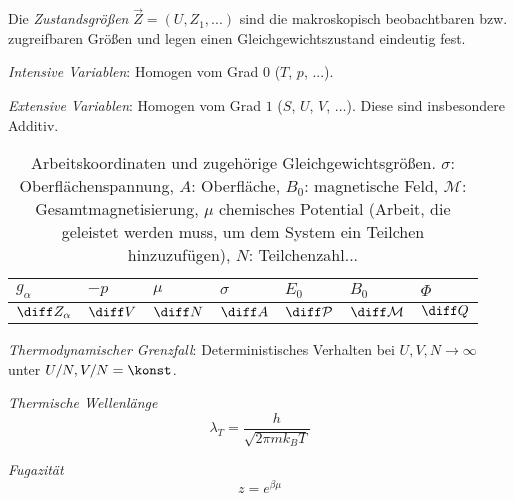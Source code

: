 \documentclass[11pt]{article}
\numberwithin{equation}{section}
\begin{document}
				Die \emph{Zustandsgrößen} $\vec{Z}=\left(U, Z_1,... \right)$ sind die makroskopisch beobachtbaren bzw. zugreifbaren Größen und legen einen Gleichgewichtszustand eindeutig fest. \vsp

				\emph{Intensive Variablen}: Homogen vom Grad $0$ ($T$, $p$, ...). \vsp

				\emph{Extensive Variablen}: Homogen vom Grad $1$ ($S$, $U$, $V$, ...). Diese sind insbesondere Additiv. \vsp

				\begin{table}[h]
					\begin{center}
					\begin{tabular}{ l | l l l l l l }
						$g_\alpha$ & $-p$ & $\mu$ & $\sigma$ & $E_0$ & $B_0$ & $\Phi$ \\ \hline
						$\diff Z_\alpha$ & $\diff V$ & $\diff N$ & $\diff A$ & $\diff \mathcal{P}$ & $\diff \mathcal{M}$ & $\diff Q$ \\
						\end{tabular}
					\caption{Arbeitskoordinaten und zugehörige Gleichgewichtsgrößen. $\sigma$: Oberflächenspannung, $A$: Oberfläche, $B_0$: magnetische Feld, $\mathcal{M}$: Gesamtmagnetisierung, $\mu$ chemisches Potential (Arbeit, die geleistet werden muss, um dem System ein Teilchen hinzuzufügen), $N$: Teilchenzahl...}
					\label{tab:ArbeitskoordinatenUndGleichgewichtsgroessen}
					\end{center}
				\end{table} \vsp

				\noindent
				\emph{Thermodynamischer Grenzfall}: \newline Deterministisches Verhalten bei $U,V,N\rightarrow\infty$ unter $U/N,V/N=\konst$. \vsp


				\noindent
				\emph{Thermische Wellenlänge}
				\begin{equation}
					\lambda_T = \frac{h}{\sqrt{2\pi m k_B T}}
				\end{equation} \vsp

				\noindent
				\emph{Fugazität}
				\begin{equation}
					z = e^{\beta\mu}
				\end{equation} \vsp
\end{document}
